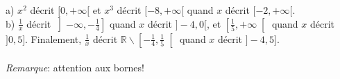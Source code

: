 a) $x^2$ décrit $[0,+\infty[$ et $x^3$ décrit $[-8,+\infty[$ quand $x$ décrit $[-2,+\infty[$.\\
b) $\frac{1}{x}$ décrit $\left]-\infty, -\frac{1}{4}\right]$ quand $x$ décrit $]-4,0[$, et $\left[\frac{1}{5}, +\infty \right[$ quand $x$ décrit $]0,5]$. Finalement, $\frac{1}{x}$ décrit $\mathbb{R}\backslash\left[-\frac{1}{4},\frac{1}{5}\right[$ quand $x$ décrit $]-4,5]$.\\ \\
\textit{Remarque}: attention aux bornes!
